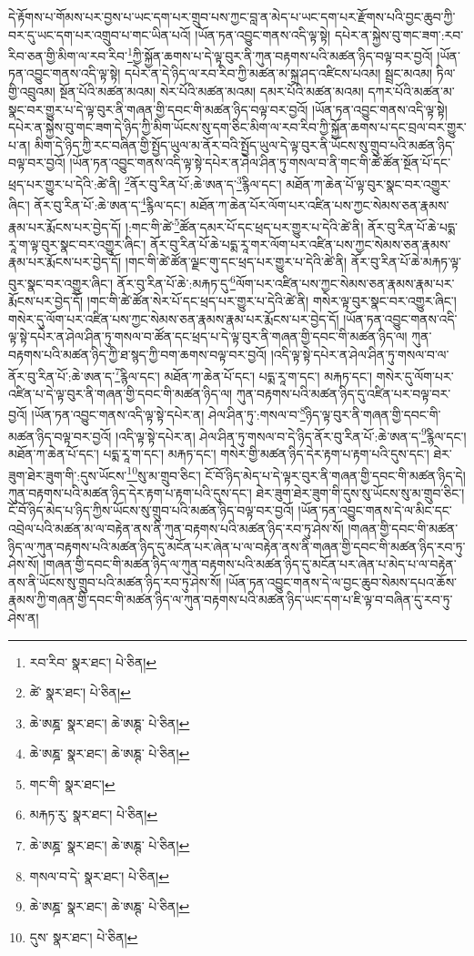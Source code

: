 དེ་རྟོགས་པ་གོམས་པར་བྱས་པ་ཡང་དག་པར་གྲུབ་པས་ཀྱང་བླ་ན་མེད་པ་ཡང་དག་པར་རྫོགས་པའི་བྱང་ཆུབ་ཀྱི་བར་དུ་ཡང་དག་པར་འགྲུབ་པ་གང་ཡིན་པའོ། །ཡོན་ཏན་འབྱུང་གནས་འདི་ལྟ་སྟེ། དཔེར་ན་སྐྱེས་བུ་གང་ཟག་:རབ་རིབ་ཅན་གྱི་མིག་ལ་རབ་རིབ་\footnote{རབ་རིབ་  སྣར་ཐང་།  པེ་ཅིན། }ཀྱི་སྐྱོན་ཆགས་པ་དེ་ལྟ་བུར་ནི་ཀུན་བརྟགས་པའི་མཚན་ཉིད་བལྟ་བར་བྱའོ། །ཡོན་ཏན་འབྱུང་གནས་འདི་ལྟ་སྟེ། དཔེར་ན་དེ་ཉིད་ལ་རབ་རིབ་ཀྱི་མཚན་མ་སྐྲ་ཤད་འཛིངས་པའམ། སྦྲང་མའམ། ཏིལ་གྱི་འབྲུའམ། སྔོན་པོའི་མཚན་མའམ། སེར་པོའི་མཚན་མའམ། དམར་པོའི་མཚན་མའམ། དཀར་པོའི་མཚན་མ་སྣང་བར་གྱུར་པ་དེ་ལྟ་བུར་ནི་གཞན་གྱི་དབང་གི་མཚན་ཉིད་བལྟ་བར་བྱའོ། །ཡོན་ཏན་འབྱུང་གནས་འདི་ལྟ་སྟེ། དཔེར་ན་སྐྱེས་བུ་གང་ཟག་དེ་ཉིད་ཀྱི་མིག་ཡོངས་སུ་དག་ཅིང་མིག་ལ་རབ་རིབ་ཀྱི་སྐྱོན་ཆགས་པ་དང་བྲལ་བར་གྱུར་པ་ན། མིག་དེ་ཉིད་ཀྱི་རང་བཞིན་གྱི་སྤྱོད་ཡུལ་མ་ནོར་བའི་སྤྱོད་ཡུལ་དེ་ལྟ་བུར་ནི་ཡོངས་སུ་གྲུབ་པའི་མཚན་ཉིད་བལྟ་བར་བྱའོ། །ཡོན་ཏན་འབྱུང་གནས་འདི་ལྟ་སྟེ་དཔེར་ན་ཤེལ་ཤིན་ཏུ་གསལ་བ་ནི་གང་གི་ཚེ་ཚོན་སྔོན་པོ་དང་ཕྲད་པར་གྱུར་པ་དེའི་:ཚེ་ནི། \footnote{ཚེ་  སྣར་ཐང་།  པེ་ཅིན། }ནོར་བུ་རིན་པོ་:ཆེ་ཨན་ད་\footnote{ཆེ་ཨཎྜ་  སྣར་ཐང་། ཆེ་ཨཎྚ་  པེ་ཅིན། }རྙིལ་དང་། མཐོན་ཀ་ཆེན་པོ་ལྟ་བུར་སྣང་བར་འགྱུར་ཞིང་། ནོར་བུ་རིན་པོ་:ཆེ་ཨན་ད་\footnote{ཆེ་ཨཎྜ་  སྣར་ཐང་། ཆེ་ཨཎྚ་  པེ་ཅིན། }རྙིལ་དང་། མཐོན་ཀ་ཆེན་པོར་ལོག་པར་འཛིན་པས་ཀྱང་སེམས་ཅན་རྣམས་རྣམ་པར་རྨོངས་པར་བྱེད་དོ། །:གང་གི་ཚེ་\footnote{གང་གི་  སྣར་ཐང་། }ཚོན་དམར་པོ་དང་ཕྲད་པར་གྱུར་པ་དེའི་ཚེ་ནི། ནོར་བུ་རིན་པོ་ཆེ་པདྨ་རཱ་ག་ལྟ་བུར་སྣང་བར་འགྱུར་ཞིང་། ནོར་བུ་རིན་པོ་ཆེ་པདྨ་རཱ་གར་ལོག་པར་འཛིན་པས་ཀྱང་སེམས་ཅན་རྣམས་རྣམ་པར་རྨོངས་པར་བྱེད་དོ། །གང་གི་ཚེ་ཚོན་ལྗང་གུ་དང་ཕྲད་པར་གྱུར་པ་དེའི་ཚེ་ནི། ནོར་བུ་རིན་པོ་ཆེ་མརྐཏ་ལྟ་བུར་སྣང་བར་འགྱུར་ཞིང་། ནོར་བུ་རིན་པོ་ཆེ་:མརྐཏ་དུ་\footnote{མརྐཏ་རུ་  སྣར་ཐང་།  པེ་ཅིན། }ལོག་པར་འཛིན་པས་ཀྱང་སེམས་ཅན་རྣམས་རྣམ་པར་རྨོངས་པར་བྱེད་དོ། །གང་གི་ཚེ་ཚོན་སེར་པོ་དང་ཕྲད་པར་གྱུར་པ་དེའི་ཚེ་ནི། གསེར་ལྟ་བུར་སྣང་བར་འགྱུར་ཞིང་། གསེར་དུ་ལོག་པར་འཛིན་པས་ཀྱང་སེམས་ཅན་རྣམས་རྣམ་པར་རྨོངས་པར་བྱེད་དོ། །ཡོན་ཏན་འབྱུང་གནས་འདི་ལྟ་སྟེ་དཔེར་ན་ཤེལ་ཤིན་ཏུ་གསལ་བ་ཚོན་དང་ཕྲད་པ་དེ་ལྟ་བུར་ནི་གཞན་གྱི་དབང་གི་མཚན་ཉིད་ལ། ཀུན་བརྟགས་པའི་མཚན་ཉིད་ཀྱི་ཐ་སྙད་ཀྱི་བག་ཆགས་བལྟ་བར་བྱའོ། །འདི་ལྟ་སྟེ་དཔེར་ན་ཤེལ་ཤིན་ཏུ་གསལ་བ་ལ་ནོར་བུ་རིན་པོ་:ཆེ་ཨན་ད་\footnote{ཆེ་ཨཎྜ་  སྣར་ཐང་། ཆེ་ཨཎྚ་  པེ་ཅིན། }རྙིལ་དང་། མཐོན་ཀ་ཆེན་པོ་དང་། པདྨ་རཱ་ག་དང་། མརྐཏ་དང་། གསེར་དུ་ལོག་པར་འཛིན་པ་དེ་ལྟ་བུར་ནི་གཞན་གྱི་དབང་གི་མཚན་ཉིད་ལ། ཀུན་བརྟགས་པའི་མཚན་ཉིད་དུ་འཛིན་པར་བལྟ་བར་བྱའོ། །ཡོན་ཏན་འབྱུང་གནས་འདི་ལྟ་སྟེ་དཔེར་ན། ཤེལ་ཤིན་ཏུ་:གསལ་བ་\footnote{གསལ་བ་དེ་  སྣར་ཐང་།  པེ་ཅིན། }ཉིད་ལྟ་བུར་ནི་གཞན་གྱི་དབང་གི་མཚན་ཉིད་བལྟ་བར་བྱའོ། །འདི་ལྟ་སྟེ་དཔེར་ན། ཤེལ་ཤིན་ཏུ་གསལ་བ་དེ་ཉིད་ནོར་བུ་རིན་པོ་:ཆེ་ཨན་ད་\footnote{ཆེ་ཨཎྜ་  སྣར་ཐང་། ཆེ་ཨཎྚ་  པེ་ཅིན། }རྙིལ་དང་། མཐོན་ཀ་ཆེན་པོ་དང་། པདྨ་རཱ་ག་དང་། མརྐཏ་དང་། གསེར་གྱི་མཚན་ཉིད་དེར་རྟག་པ་རྟག་པའི་དུས་དང་། ཐེར་ཟུག་ཐེར་ཟུག་གི་:དུས་ཡོངས་\footnote{དུས་  སྣར་ཐང་།  པེ་ཅིན། }སུ་མ་གྲུབ་ཅིང་། ངོ་བོ་ཉིད་མེད་པ་དེ་ལྟར་བུར་ནི་གཞན་གྱི་དབང་གི་མཚན་ཉིད་དེ། ཀུན་བརྟགས་པའི་མཚན་ཉིད་དེར་རྟག་པ་རྟག་པའི་དུས་དང་། ཐེར་ཟུག་ཐེར་ཟུག་གི་དུས་སུ་ཡོངས་སུ་མ་གྲུབ་ཅིང་། ངོ་བོ་ཉིད་མེད་པ་ཉིད་ཀྱིས་ཡོངས་སུ་གྲུབ་པའི་མཚན་ཉིད་བལྟ་བར་བྱའོ། །ཡོན་ཏན་འབྱུང་གནས་དེ་ལ་མིང་དང་འབྲེལ་པའི་མཚན་མ་ལ་བརྟེན་ནས་ནི་ཀུན་བརྟགས་པའི་མཚན་ཉིད་རབ་ཏུ་ཤེས་སོ། །གཞན་གྱི་དབང་གི་མཚན་ཉིད་ལ་ཀུན་བརྟགས་པའི་མཚན་ཉིད་དུ་མངོན་པར་ཞེན་པ་ལ་བརྟེན་ནས་ནི་གཞན་གྱི་དབང་གི་མཚན་ཉིད་རབ་ཏུ་ཤེས་སོ། །གཞན་གྱི་དབང་གི་མཚན་ཉིད་ལ་ཀུན་བརྟགས་པའི་མཚན་ཉིད་དུ་མངོན་པར་ཞེན་པ་མེད་པ་ལ་བརྟེན་ནས་ནི་ཡོངས་སུ་གྲུབ་པའི་མཚན་ཉིད་རབ་ཏུ་ཤེས་སོ། །ཡོན་ཏན་འབྱུང་གནས་དེ་ལ་བྱང་ཆུབ་སེམས་དཔའ་ཆོས་རྣམས་ཀྱི་གཞན་གྱི་དབང་གི་མཚན་ཉིད་ལ་ཀུན་བརྟགས་པའི་མཚན་ཉིད་ཡང་དག་པ་ཇི་ལྟ་བ་བཞིན་དུ་རབ་ཏུ་ཤེས་ན། 